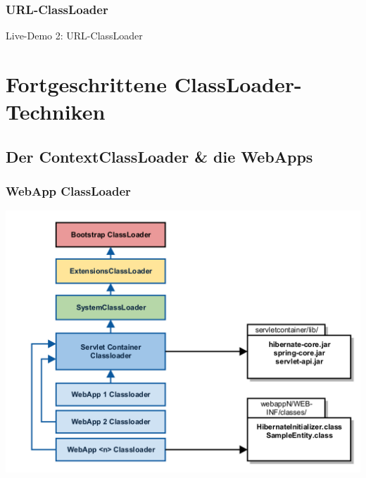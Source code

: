 \documentclass[aspectratio=169]{beamer}
\begin{document}
\begin{frame}
	\frametitle{URL-ClassLoader}
	
\end{frame}

\begin{frame}
	Live-Demo 2: URL-ClassLoader
\end{frame}
 
\section{Fortgeschrittene ClassLoader-Techniken}


	\subsection{Der ContextClassLoader \& die WebApps}
	\begin{frame}
		\frametitle{WebApp ClassLoader}
		\begin{center}
			\includegraphics[scale=0.1]{assets/contextclassloader/webappclassloader-1.png} 
		\end{center}
	\end{frame}
\end{document}
